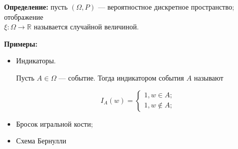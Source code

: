 \textbf{Определение:} пусть $(\Omega, P)$ --- вероятностное дискретное пространство; отображение \\ $\xi: \Omega \to \mathbb{R}$ называется случайной величиной.

\textbf{Примеры:} 
\begin{itemize}
    \item Индикаторы.

        Пусть $A\in \Omega$ --- событие. Тогда индикатором события $A$ называют

        \[
            I_A(w) = \begin{cases}
                1, w \in A; \\
                1, w \not\in A;
            \end{cases}
        \]

    \item Бросок игральной кости;

    \item Схема Бернулли
\end{itemize}


